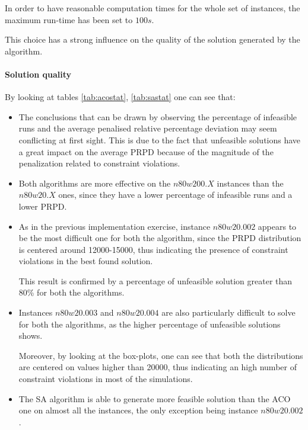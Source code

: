 In order to have reasonable computation times for the whole set of instances, the maximum run-time has been set to $100s$.
  
This choice has a strong influence on the quality of the solution generated by the algorithm.

\paragraph{Solution quality}

By looking at tables \ref{tab:acostat}, \ref{tab:sastat} one can see that:
\begin{itemize}

\item The conclusions that can be drawn by observing the percentage of infeasible runs and the average penalised relative percentage deviation may seem conflicting at first sight. 
This is due to the fact that unfeasible solutions have a great impact on the average PRPD because of the magnitude of the penalization related to constraint violations.

\item Both algorithms are more effective on the $n80w200.X$ instances than the $n80w20.X$ ones, since they have a lower percentage of infeasible runs and a lower PRPD.

\item As in the previous implementation exercise, instance $n80w20.002$ appears to be the most difficult one for both the algorithm, since the PRPD distribution is centered around 12000-15000, thus indicating the presence of constraint violations in the best found solution.

This result is confirmed by a percentage of unfeasible solution greater than 80\% for both the algorithms.

\item Instances $n80w20.003$ and $n80w20.004$ are also particularly difficult to solve for both the algorithms, as the higher percentage of unfeasible solutions shows.

Moreover, by looking at the box-plots, one can see that both the distributions are centered on values higher than 20000, thus indicating an high number of constraint violations in most of the simulations.


\item The SA algorithm is able to generate more feasible solution than the ACO one on almost all the instances, the only exception being instance $n80w20.002$.


\end{itemize}
